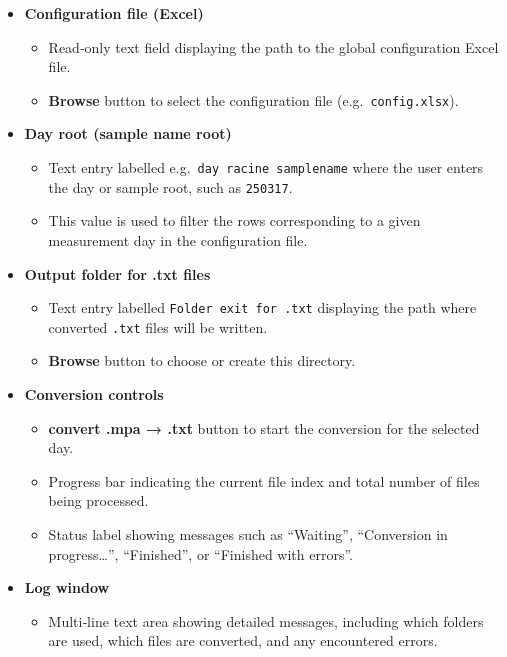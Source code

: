 \begin{itemize}
\tightlist
\item
  \textbf{Configuration file (Excel)}

  \begin{itemize}
  \tightlist
  \item
    Read‑only text field displaying the path to the global configuration
    Excel file.\\
  \item
    \textbf{Browse} button to select the configuration file
    (e.g.~\texttt{config.xlsx}).
  \end{itemize}
\item
  \textbf{Day root (sample name root)}

  \begin{itemize}
  \tightlist
  \item
    Text entry labelled e.g.~\texttt{day\ racine\ samplename} where the
    user enters the day or sample root, such as \texttt{250317}.\\
  \item
    This value is used to filter the rows corresponding to a given
    measurement day in the configuration file.
  \end{itemize}
\item
  \textbf{Output folder for .txt files}

  \begin{itemize}
  \tightlist
  \item
    Text entry labelled \texttt{Folder\ exit\ for\ .txt} displaying the
    path where converted \texttt{.txt} files will be written.\\
  \item
    \textbf{Browse} button to choose or create this directory.
  \end{itemize}
\item
  \textbf{Conversion controls}

  \begin{itemize}
  \tightlist
  \item
    \textbf{convert .mpa → .txt} button to start the conversion for the
    selected day.\\
  \item
    Progress bar indicating the current file index and total number of
    files being processed.\\
  \item
    Status label showing messages such as ``Waiting'', ``Conversion in
    progress\ldots{}'', ``Finished'', or ``Finished with errors''.
  \end{itemize}
\item
  \textbf{Log window}

  \begin{itemize}
  \tightlist
  \item
    Multi‑line text area showing detailed messages, including which
    folders are used, which files are converted, and any encountered
    errors.
  \end{itemize}
\end{itemize}

